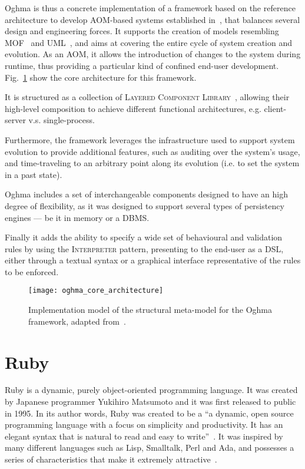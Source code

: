 Oghma is thus a concrete implementation of a framework based on the reference architecture to develop AOM-based systems established in~\cite{ferreira_phd_2010}, that balances several design and engineering forces. It supports the creation of models resembling MOF~\cite{mof} and UML~\cite{uml}, and aims at covering the entire cycle of system creation and evolution. As an AOM, it allows the introduction of changes to the system during runtime, thus providing a particular kind of confined end-user development. Fig.~\ref{fig:oghma_core_architecture} show the core architecture for this framework.

It is structured as a collection of \textsc{Layered Component Library}~\cite{metaprogramming_metamodeling}, allowing their high-level composition to achieve different functional architectures, e.g. client-server v.s. single-process.

Furthermore, the framework leverages the infrastructure used to support system evolution to provide additional features, such as auditing over the system’s usage, and time-traveling to an arbitrary point along its evolution (i.e. to set the system in a past state).

Oghma includes a set of interchangeable components designed to have an high degree of flexibility, as it was designed to support several types of persistency engines --- be it in memory or a DBMS.

Finally it adds the ability to specify a wide set of behavioural and validation rules by using the \textsc{Interpreter} pattern\cite{gang_of_four}, presenting to the end-user as a  DSL, either through a textual syntax or a graphical interface representative of the rules to be enforced.

\begin{figure}[H]
  \centering
  \texttt{[image: oghma\_core\_architecture]}
  \caption{Implementation model of the structural meta-model for the Oghma framework, adapted from~\cite{ferreira_phd_2010}.}
  \label{fig:oghma_core_architecture}
\end{figure}

\section{Ruby}\label{sec:ruby}

Ruby is a dynamic, purely object-oriented programming language. It was created by Japanese programmer Yukihiro Matsumoto and it was first released to public in 1995. In its author words, Ruby was created to be a ``a dynamic, open source programming language with a focus on simplicity and productivity. It has an elegant syntax that is natural to read and easy to write''~\cite{ruby}. It was inspired by many different languages such as Lisp, Smalltalk, Perl and Ada, and possesses a series of characteristics that make it extremely attractive~\cite{ruby}.

